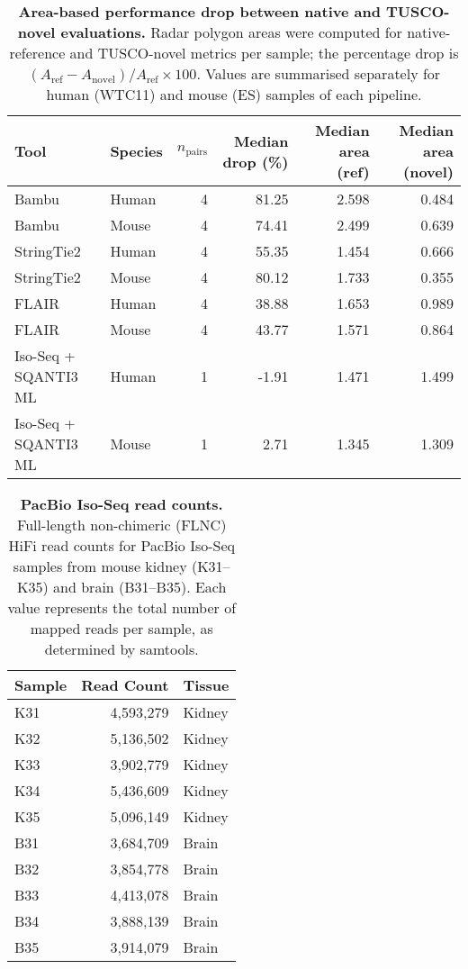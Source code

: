 {  \begin{table}[htbp]
      \centering
      \caption{\textbf{Area-based performance drop between native and TUSCO-novel evaluations.} Radar polygon areas were computed for native-reference and TUSCO-novel metrics per sample; the percentage drop is $(A_{\mathrm{ref}} - A_{\mathrm{novel}}) / A_{\mathrm{ref}} \times 100$. Values are summarised separately for human (WTC11) and mouse (ES) samples of each pipeline.}
      \label{tab:s2}
      {\footnotesize
      \begin{tabular*}{\textwidth}{@{\extracolsep{\fill}}llrrrr@{}}
          \toprule
          Tool & Species & $n_{\text{pairs}}$ & Median drop (\%) & Median area (ref) & Median area (novel) \\
          \midrule
          Bambu & Human & 4 & 81.25 & 2.598 & 0.484 \\
          Bambu & Mouse & 4 & 74.41 & 2.499 & 0.639 \\
          StringTie2 & Human & 4 & 55.35 & 1.454 & 0.666 \\
          StringTie2 & Mouse & 4 & 80.12 & 1.733 & 0.355 \\
          FLAIR & Human & 4 & 38.88 & 1.653 & 0.989 \\
          FLAIR & Mouse & 4 & 43.77 & 1.571 & 0.864 \\
          Iso-Seq + SQANTI3 ML & Human & 1 & -1.91 & 1.471 & 1.499 \\
          Iso-Seq + SQANTI3 ML & Mouse & 1 & 2.71 & 1.345 & 1.309 \\
          \bottomrule
      \end{tabular*}
      }
  \end{table}

  \begin{table}[htbp]
      \centering
      \caption{\textbf{PacBio Iso-Seq read counts.} Full-length non-chimeric (FLNC) HiFi read counts for PacBio Iso-Seq samples from mouse kidney (K31--K35) and brain (B31--B35). Each value represents the total number of mapped reads per sample, as determined by samtools.}
      \label{tab:s3}
      \begin{tabular*}{\textwidth}{@{\extracolsep{\fill}}lrl@{}}
          \toprule
          Sample & Read Count & Tissue \\
          \midrule
          K31 & 4,593,279 & Kidney \\
          K32 & 5,136,502 & Kidney \\
          K33 & 3,902,779 & Kidney \\
          K34 & 5,436,609 & Kidney \\
          K35 & 5,096,149 & Kidney \\
          B31 & 3,684,709 & Brain \\
          B32 & 3,854,778 & Brain \\
          B33 & 4,413,078 & Brain \\
          B34 & 3,888,139 & Brain \\
          B35 & 3,914,079 & Brain \\
          \bottomrule
      \end{tabular*}
  \end{table}
}

